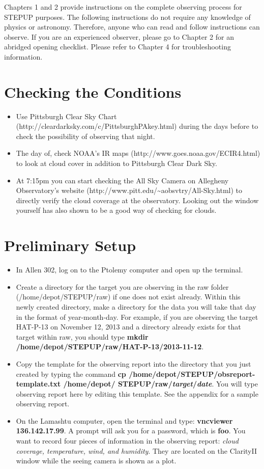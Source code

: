 \documentclass[11pt]{report}
\begin{document}
Chapters 1 and 2 provide instructions on the complete observing process for STEPUP purposes. The following instructions do not require any knowledge of physics or astronomy. Therefore, anyone who can read and follow instructions can observe. If you are an experienced observer, please go to Chapter 2 for an abridged opening checklist. Please refer to Chapter 4 for troubleshooting information.

\section{Checking the Conditions}

\begin{itemize}
\item Use Pittsburgh Clear Sky Chart (http://cleardarksky.com/c/PittsburghPAkey.html) during the days before to check the possibility of observing that night. 
\item The day of, check NOAA's IR maps (http://www.goes.noaa.gov/ECIR4.html) to look at cloud cover in addition to Pittsburgh Clear Dark Sky.
\item At 7:15pm you can start checking the All Sky Camera on Allegheny Observatory's website (http://www.pitt.edu/{\textasciitilde}aobsvtry/All-Sky.html) to directly verify the cloud coverage at the observatory. Looking out the window yourself has also shown to be a good way of checking for clouds.
\end{itemize}

\section{Preliminary Setup}

\begin{itemize}
\item In Allen 302, log on to the Ptolemy computer and open up the terminal.
\item Create a directory for the target you are observing in the raw folder (/home/depot/STEPUP/raw) if one does not exist already. Within this newly created directory, make a directory for the data you will take that day in the format of year-month-day. For example, if you are observing the target HAT-P-13 on November 12, 2013 and a directory already exists for that target within raw, you should type {\bf mkdir /home/depot/STEPUP/raw/HAT-P-13/2013-11-12\bf}.
\item Copy the template for the observing report into the directory that you just created by typing the command {\bf cp /home/depot/STEPUP/obsreport-template.txt /home/depot/ \bf} {\bf STEPUP/raw/\emph{target}/\emph{date}\bf}. You will type observing report here by editing this template. See the appendix for a sample observing report.
\item On the Lamashtu computer, open the terminal and type: {\bf vncviewer 136.142.17.99}. A prompt will ask you for a password, which is {\bf foo}. You want to record four pieces of information in the observing report: \emph{cloud coverage, temperature, wind, and humidity}. They are located on the ClarityII window while the seeing camera is shown as a plot. 
\end{itemize}
	
\end{document}

